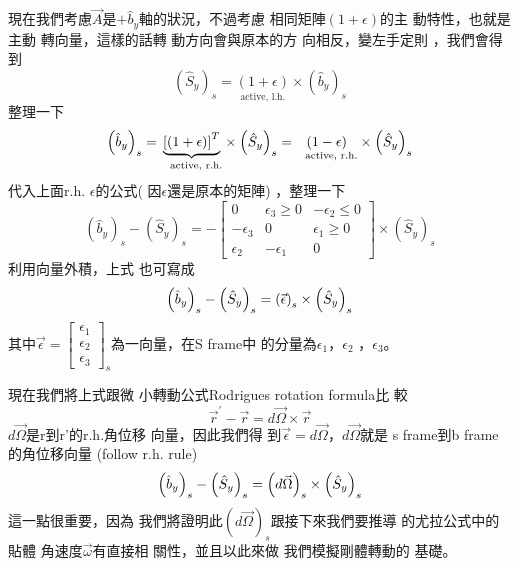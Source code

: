 \documentclass[12pt,twoside]{article}
\begin{document}
現在我們考慮$\vec{A}$是$+\hat{b}%
_{y}$軸的狀況，不過考慮%
相同矩陣$\left( 1+\epsilon \right) $的主%
動特性，也就是主動%
轉向量，這樣的話轉%
動方向會與原本的方%
向相反，變左手定則%
，我們會得到%
\begin{equation*}
\left( \hat{S}_{y}\right) _{s}=\underset{\text{active, l.h.}}{\left(
1+\epsilon \right) }\times \left( \hat{b}_{y}\right) _{s}
\end{equation*}%
整理一下%
\begin{equation*}
\left( \hat{b}_{y}\right) _{s}=\underset{\text{active, r.h.}}{\underbrace{%
\left[ \left( 1+\epsilon \right) \right] ^{T}}}\times \left( \hat{S}%
_{y}\right) _{s}=\underset{\text{active, r.h.}}{\left( 1-\epsilon \right) }%
\times \left( \hat{S}_{y}\right) _{s}
\end{equation*}%
代入上面r.h. $\epsilon $的公式(%
因$\epsilon $還是原本的矩陣)%
，整理一下%
\begin{equation*}
\left( \hat{b}_{y}\right) _{s}-\left( \hat{S}_{y}\right) _{s}=-\left[ 
\begin{array}{ccc}
0 & \epsilon _{3}\geq 0 & -\epsilon _{2}\leq 0 \\ 
-\epsilon _{3} & 0 & \epsilon _{1}\geq 0 \\ 
\epsilon _{2} & -\epsilon _{1} & 0%
\end{array}%
\right] \times \left( \hat{S}_{y}\right) _{s}
\end{equation*}%
利用向量外積，上式%
也可寫成%
\begin{equation*}
\left( \hat{b}_{y}\right) _{s}-\left( \hat{S}_{y}\right) _{s}=\left( \vec{%
\epsilon}\right) _{s}\times \left( \hat{S}_{y}\right) _{s}
\end{equation*}%
其中$\vec{\epsilon}=\left[ 
\begin{array}{c}
\epsilon _{1} \\ 
\epsilon _{2} \\ 
\epsilon _{3}%
\end{array}%
\right] _{s}$為一向量，在S frame中%
的分量為$\epsilon _{1}$，$\epsilon _{2}$%
，$\epsilon _{3}$。

現在我們將上式跟微%
小轉動公式Rodrigues rotation formula比%
較%
\begin{equation*}
\vec{r}^{\prime }-\vec{r}=d\vec{\Omega}\times \vec{r}
\end{equation*}%
$d\vec{\Omega}$是r到r'的r.h.角位移%
向量\thinspace ，因此我們得%
到$\vec{\epsilon}=d\vec{\Omega}$，$d\vec{\Omega}$就是%
s frame到b frame的角位移向量%
(follow r.h. rule)%
\begin{equation*}
\left( \hat{b}_{y}\right) _{s}-\left( \hat{S}_{y}\right) _{s}=\left( d\vec{%
\Omega}\right) _{s}\times \left( \hat{S}_{y}\right) _{s}
\end{equation*}%
這一點很重要，因為%
我們將證明此$\left( d\vec{\Omega}\right)
_{s}$跟接下來我們要推導%
的尤拉公式中的貼體%
角速度$\vec{\omega}$有直接相%
關性，並且以此來做%
我們模擬剛體轉動的%
基礎。
\end{document}

